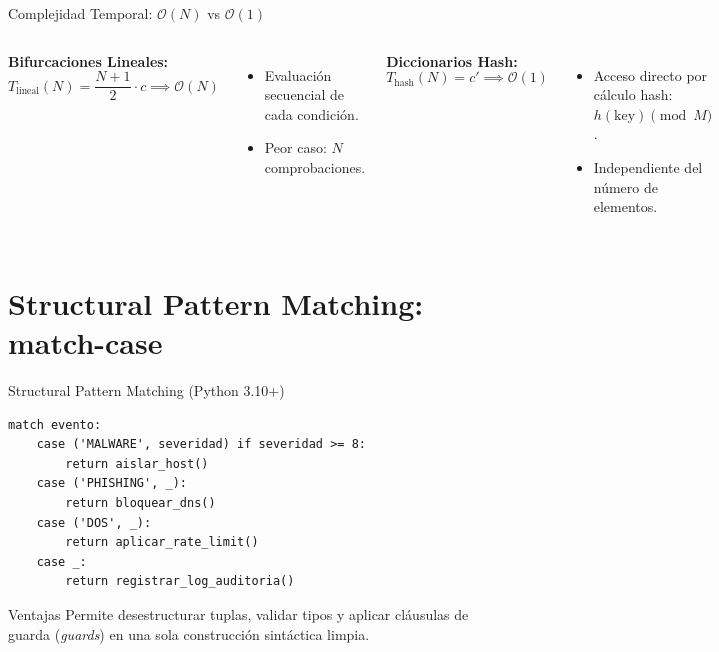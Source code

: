 \documentclass[aspectratio=169]{beamer}
\begin{document}
\begin{frame}{Complejidad Temporal: $\mathcal{O}(N)$ vs $\mathcal{O}(1)$}
    \begin{columns}
        \textbf{Bifurcaciones Lineales:}
        \begin{equation*}
            T_{\text{lineal}}(N) = \frac{N + 1}{2} \cdot c \implies \mathcal{O}(N)
        \end{equation*}
        \begin{itemize}
            \item Evaluación secuencial de cada condición.
            \item Peor caso: $N$ comprobaciones.
        \end{itemize}
        \textbf{Diccionarios Hash:}
        \begin{equation*}
            T_{\text{hash}}(N) = c' \implies \mathcal{O}(1)
        \end{equation*}
        \begin{itemize}
            \item Acceso directo por cálculo hash: $h(\text{key}) \pmod M$.
            \item Independiente del número de elementos.
        \end{itemize}
    \end{columns}
\end{frame}

\section{Structural Pattern Matching: match-case}

\begin{frame}[fragile]{Structural Pattern Matching (Python 3.10+)}
\begin{lstlisting}
match evento:
    case ('MALWARE', severidad) if severidad >= 8:
        return aislar_host()
    case ('PHISHING', _):
        return bloquear_dns()
    case ('DOS', _):
        return aplicar_rate_limit()
    case _:
        return registrar_log_auditoria()
\end{lstlisting}
\begin{exampleblock}{Ventajas}
    Permite desestructurar tuplas, validar tipos y aplicar cláusulas de guarda (\textit{guards}) en una sola construcción sintáctica limpia.
\end{exampleblock}
\end{frame}
\end{document}

